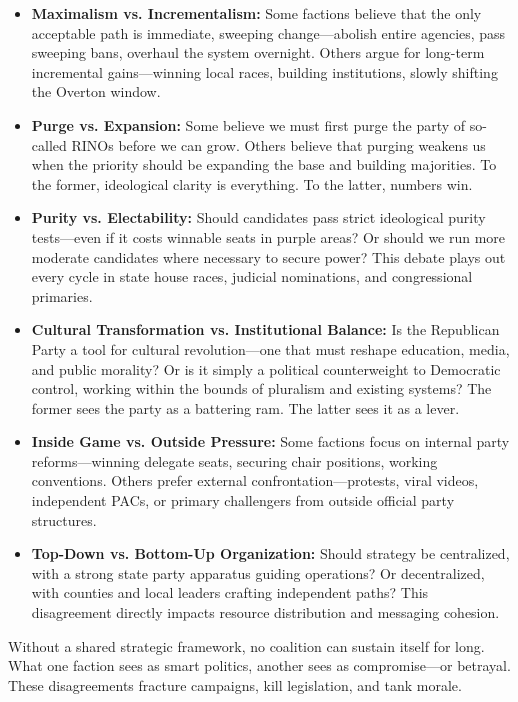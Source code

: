 \begin{itemize}
\item \textbf{Maximalism vs. Incrementalism:} Some factions believe that the only acceptable path is immediate, sweeping change—abolish entire agencies, pass sweeping bans, overhaul the system overnight. Others argue for long-term incremental gains—winning local races, building institutions, slowly shifting the Overton window.

\item \textbf{Purge vs. Expansion:} Some believe we must first purge the party of so-called RINOs before we can grow. Others believe that purging weakens us when the priority should be expanding the base and building majorities. To the former, ideological clarity is everything. To the latter, numbers win.

\item \textbf{Purity vs. Electability:} Should candidates pass strict ideological purity tests—even if it costs winnable seats in purple areas? Or should we run more moderate candidates where necessary to secure power? This debate plays out every cycle in state house races, judicial nominations, and congressional primaries.

\item \textbf{Cultural Transformation vs. Institutional Balance:} Is the Republican Party a tool for cultural revolution—one that must reshape education, media, and public morality? Or is it simply a political counterweight to Democratic control, working within the bounds of pluralism and existing systems? The former sees the party as a battering ram. The latter sees it as a lever.

\item \textbf{Inside Game vs. Outside Pressure:} Some factions focus on internal party reforms—winning delegate seats, securing chair positions, working conventions. Others prefer external confrontation—protests, viral videos, independent PACs, or primary challengers from outside official party structures.

\item \textbf{Top-Down vs. Bottom-Up Organization:} Should strategy be centralized, with a strong state party apparatus guiding operations? Or decentralized, with counties and local leaders crafting independent paths? This disagreement directly impacts resource distribution and messaging cohesion.

\end{itemize}

Without a shared strategic framework, no coalition can sustain itself for long. What one faction sees as smart politics, another sees as compromise—or betrayal. These disagreements fracture campaigns, kill legislation, and tank morale.

